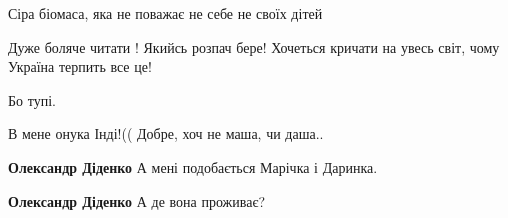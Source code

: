 \begin{itemize}
 
Сіра біомаса, яка не поважає не себе не своїх дітей

 
Дуже боляче читати ! Якийсь розпач бере! Хочеться кричати на увесь світ, чому Україна терпить все це!

\begin{itemize}
 
Бо тупі.
\end{itemize}

 
В мене онука Інді!((
Добре, хоч не маша, чи даша..

\begin{itemize}
 
\textbf{Олександр Діденко} А мені подобається Марічка і Даринка.

 
\textbf{Олександр Діденко} А де вона проживає?

 

\end{itemize}
\end{itemize}
